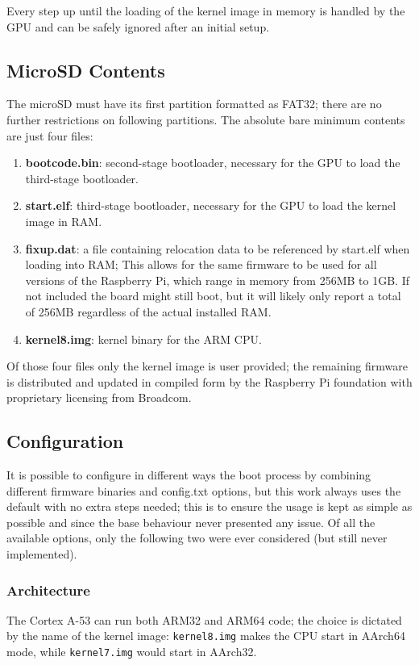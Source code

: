 \documentclass[12pt,a4paper,openright,twoside]{report}
\begin{document}
Every step up until the loading of the kernel image in memory is handled by 
the GPU and can be safely ignored after an initial setup.

\subsection{MicroSD Contents}
The microSD must have its first partition formatted as FAT32; there are no 
further restrictions on following partitions. The absolute bare minimum contents 
are just four files:
\begin{enumerate}
    \item \textbf{bootcode.bin}: second-stage bootloader, necessary for the GPU
            to load the third-stage bootloader.
    \item \textbf{start.elf}: third-stage bootloader, necessary for the GPU to load
            the kernel image in RAM.
    \item \textbf{fixup.dat}: a file containing relocation data to be referenced 
            by start.elf when loading into RAM; This allows for the same firmware 
            to be used for all versions of the Raspberry Pi, which range in 
            memory from 256MB to 1GB. If not included the board might still boot,
            but it will likely only report a total of 256MB regardless of the
            actual installed RAM.
    \item \textbf{kernel8.img}: kernel binary for the ARM CPU.
\end{enumerate}
Of those four files only the kernel image is user provided; the remaining firmware
is distributed and updated in compiled form by the Raspberry Pi foundation with
proprietary licensing from Broadcom.

\subsection{Configuration}
It is possible to configure in different ways the boot process by combining
different firmware binaries and config.txt options, but this work always uses
the default with no extra steps needed; this is to ensure the usage is kept
as simple as possible and since the base behaviour never presented any issue.
Of all the available options, only the following two were ever considered 
(but still never implemented).

\subsubsection{Architecture}
The Cortex A-53 can run both ARM32 and ARM64 code; the choice is dictated by the
name of the kernel image: {\tt kernel8.img} makes the CPU start in AArch64 mode,
while {\tt kernel7.img} would start in AArch32.
\end{document}
